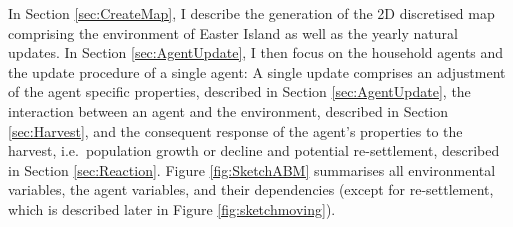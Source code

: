 In Section \ref{sec:CreateMap}, I describe the generation of the 2D discretised map comprising the environment of Easter Island as well as the yearly natural updates. In Section \ref{sec:AgentUpdate}, I then focus on the household agents and the update procedure of a single agent:
A single update comprises an adjustment of the agent specific properties, described in Section \ref{sec:AgentUpdate}, the interaction between an agent and the environment, described in Section \ref{sec:Harvest}, and the consequent response of the agent's properties to the harvest, i.e.\ population growth or decline and potential re-settlement, described in Section \ref{sec:Reaction}.
Figure \ref{fig:SketchABM} summarises all environmental variables, the agent variables, and their dependencies (except for re-settlement, which is described later in Figure \ref{fig:sketchmoving}).

